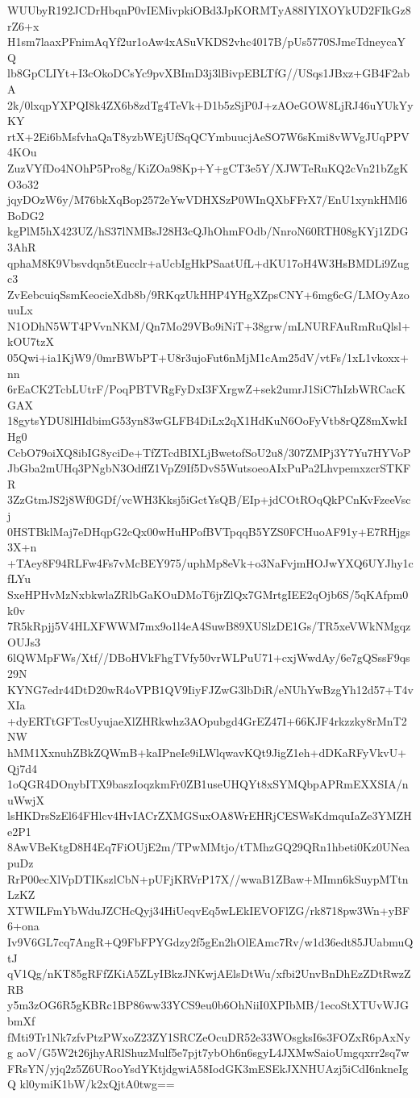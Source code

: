 WUUbyR192JCDrHbqnP0vIEMivpkiOBd3JpKORMTyA88IYIXOYkUD2FIkGz8rZ6+x
H1sm7laaxPFnimAqYf2ur1oAw4xASuVKDS2vhc4017B/pUs5770SJmeTdneycaYQ
lb8GpCLIYt+I3cOkoDCsYc9pvXBImD3j3lBivpEBLTfG//USqs1JBxz+GB4F2abA
2k/0lxqpYXPQI8k4ZX6b8zdTg4TeVk+D1b5zSjP0J+zAOeGOW8LjRJ46uYUkYyKY
rtX+2Ei6bMsfvhaQaT8yzbWEjUfSqQCYmbuucjAeSO7W6sKmi8vWVgJUqPPV4KOu
ZuzVYfDo4NOhP5Pro8g/KiZOa98Kp+Y+gCT3e5Y/XJWTeRuKQ2cVn21bZgKO3o32
jqyDOzW6y/M76bkXqBop2572eYwVDHXSzP0WInQXbFFrX7/EnU1xynkHMl6BoDG2
kgPlM5hX423UZ/hS37lNMBsJ28H3cQJhOhmFOdb/NnroN60RTH08gKYj1ZDG3AhR
qphaM8K9Vbsvdqn5tEucclr+aUcbIgHkPSaatUfL+dKU17oH4W3HsBMDLi9Zugc3
ZvEebcuiqSsmKeocieXdb8b/9RKqzUkHHP4YHgXZpsCNY+6mg6cG/LMOyAzouuLx
N1ODhN5WT4PVvnNKM/Qn7Mo29VBo9iNiT+38grw/mLNURFAuRmRuQlsl+kOU7tzX
05Qwi+ia1KjW9/0mrBWbPT+U8r3ujoFut6nMjM1cAm25dV/vtFs/1xL1vkoxx+nn
6rEaCK2TcbLUtrF/PoqPBTVRgFyDxI3FXrgwZ+sek2umrJ1SiC7hIzbWRCacKGAX
18gytsYDU8lHIdbimG53yn83wGLFB4DiLx2qX1HdKuN6OoFyVtb8rQZ8mXwkIHg0
CcbO79oiXQ8ibIG8yciDe+TfZTcdBIXLjBwetofSoU2u8/307ZMPj3Y7Yu7HYVoP
JbGba2mUHq3PNgbN3OdffZ1VpZ9If5DvS5WutsoeoAIxPuPa2LhvpemxzcrSTKFR
3ZzGtmJS2j8Wf0GDf/vcWH3Kksj5iGctYsQB/EIp+jdCOtROqQkPCnKvFzeeVscj
0HSTBklMaj7eDHqpG2cQx00wHuHPofBVTpqqB5YZS0FCHuoAF91y+E7RHjgs3X+n
+TAey8F94RLFw4Fs7vMcBEY975/uphMp8eVk+o3NaFvjmHOJwYXQ6UYJhy1cfLYu
SxeHPHvMzNxbkwlaZRlbGaKOuDMoT6jrZlQx7GMrtgIEE2qOjb6S/5qKAfpm0k0v
7R5kRpjj5V4HLXFWWM7mx9o1l4eA4SuwB89XUSlzDE1Gs/TR5xeVWkNMgqzOUJs3
6lQWMpFWs/Xtf//DBoHVkFhgTVfy50vrWLPuU71+cxjWwdAy/6e7gQSssF9qs29N
KYNG7edr44DtD20wR4oVPB1QV9IiyFJZwG3lbDiR/eNUhYwBzgYh12d57+T4vXIa
+dyERTtGFTcsUyujaeXlZHRkwhz3AOpubgd4GrEZ47I+66KJF4rkzzky8rMnT2NW
hMM1XxnuhZBkZQWmB+kaIPneIe9iLWlqwavKQt9JigZ1eh+dDKaRFyVkvU+Qj7d4
1oQGR4DOnybITX9baszIoqzkmFr0ZB1useUHQYt8xSYMQbpAPRmEXXSIA/nuWwjX
lsHKDrsSzEl64FHlcv4HvIACrZXMGSuxOA8WrEHRjCESWsKdmquIaZe3YMZHe2P1
8AwVBeKtgD8H4Eq7FiOUjE2m/TPwMMtjo/tTMhzGQ29QRn1hbeti0Kz0UNeapuDz
RrP00ecXlVpDTIKszlCbN+pUFjKRVrP17X//wwaB1ZBaw+MImn6kSuypMTtnLzKZ
XTWILFmYbWduJZCHcQyj34HiUeqvEq5wLEkIEVOFlZG/rk8718pw3Wn+yBF6+ona
Iv9V6GL7cq7AngR+Q9FbFPYGdzy2f5gEn2hOlEAmc7Rv/w1d36edt85JUabmuQtJ
qV1Qg/nKT85gRFfZKiA5ZLyIBkzJNKwjAElsDtWu/xfbi2UnvBnDhEzZDtRwzZRB
y5m3zOG6R5gKBRc1BP86ww33YCS9eu0b6OhNiiI0XPIbMB/1ecoStXTUvWJGbmXf
fMti9Tr1Nk7zfvPtzPWxoZ23ZY1SRCZeOcuDR52e33WOsgksI6s3FOZxR6pAxNyg
aoV/G5W2t26jhyARlShuzMulf5e7pjt7ybOh6n6sgyL4JXMwSaioUmgqxrr2sq7w
FRsYN/yjq2z5Z6URooYsdYKtjdgwiA58IodGK3mESEkJXNHUAzj5iCdI6nkneIgQ
kl0ymiK1bW/k2xQjtA0twg==
